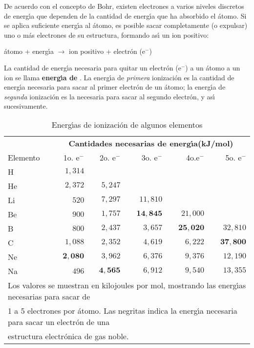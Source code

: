 De acuerdo con el concepto de Bohr, existen electrones a varios niveles discretos de
energ\'{\i}a que dependen de la cantidad de energ\'{\i}a que ha absorbido el
\'atomo. Si se aplica suficiente energ\'{\i}a al \'atomo, es posible sacar
completamente (o expulsar) uno o m\'as electrones de su estructura, formando
as\'{\i} un ion positivo:
\begin{center}
\'atomo + energ\'{\i}a $\longrightarrow$ ion positivo + electr\'on (e$^-$)
\end{center}
La cantidad de energ\'{\i}a necesaria para quitar un electr\'on (e$^-$) a un \'atomo  a un ion se llama \textbf{energ\'{\i}a de }. La energ\'{\i}a de \textit{primera} ionizaci\'on es la cantidad de energ\'{\i}a necesaria para sacar al primer electr\'on de un \'atomo; la energ\'{\i}a de \textit{segunda} ionizaci\'on es la necesaria para sacar al segundo electr\'on, y as\'{\i} sucesivamente.
\begin{table}
\caption[Energ\'{\i}as de ionizaci\'on]{Energ\'{\i}as de ionizaci\'on de algunos elementos}
\label{ionizacion}
\begin{center}
\begin{tabular}{l r r r r r}\hline
&\multicolumn{5}{c}{\textbf{Cantidades necesarias de energ\'{\i}a(kJ/mol)}}\\
\cline{2-6}
  Elemento &1o. e$^-$&2o. e$^-$&3o. e$^-$&4o.e$^-$&5o. e$^-$\\ \hline
H  &$1,314 $\\
He &$2,372 $& $5,247$\\
Li &$520   $& $7,297$ & $11,810$ \\
Be &$900   $& $1,757$ & $\mathbf{14,845}$ &$ 21,000$\\
B  &$800   $& $2,437$ & $ 3,657$ & $\mathbf{25,020}$&$ 32,810$\\
C  &$1,088$ & $2,352$ & $ 4,619$ &$  6,222$&  $\mathbf{37,800}$\\
Ne &$\mathbf{2,080}$ & $3,962 $& $ 6,376$ &  $9,376$& $ 12,190$\\
Na &$ 496$ & $\mathbf{4,565}$ & $ 6,912$ &  $9,540$&  $13,355$\\\hline
\multicolumn{6}{l}{\tiny Los valores se muestran en kilojoules por mol,
mostrando las energ\'{\i}as necesarias para sacar de}\\[-.1in]
\multicolumn{6}{l}{\tiny 1 a 5 electrones por \'atomo. 
Las negritas indica la energ\'{\i}a necesaria para sacar un electr\'on de
una}\\[-.1in]
\multicolumn{6}{l}{\tiny   estructura
electr\'onica de gas noble.}\\
\end{tabular}
\end{center}
\end{table}

